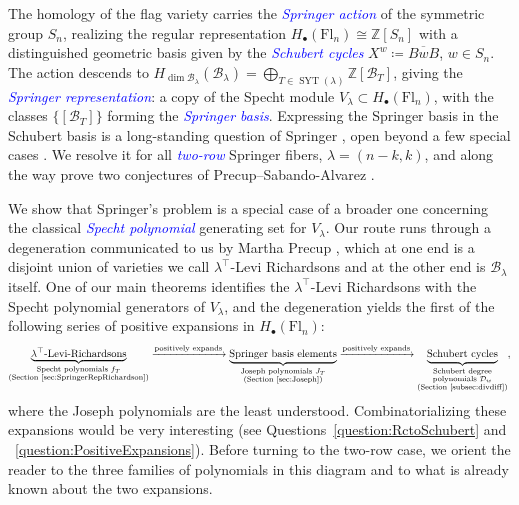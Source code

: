 \documentclass[11pt]{amsart}
\theoremstyle{definition}
\numberwithin{equation}{section}
\newcommand{\fl}[1]{\mathrm{Fl}_{#1}}
\renewcommand\emph[1]{\textcolor{blue}{\textit{#1}}} %
\newcommand{\syt}{\operatorname{SYT}} %
\begin{document}
The homology of the flag variety carries the \emph{Springer action} of the symmetric group $S_n$, realizing the regular representation $H_\bullet(\fl{n})\cong \mathbb{Z}[S_n]$ with a distinguished geometric basis given by the \emph{Schubert cycles} $X^w\coloneqq \overline{BwB}$, $w\in S_n$.
The action descends to $H_{\dim \mathcal{B}_\lambda}(\mathcal{B}_\lambda)=\bigoplus_{T\in \syt(\lambda)}\mathbb{Z}[\mathcal{B}_T]$, giving the \emph{Springer representation}: a copy of the Specht module $V_\lambda\subset H_\bullet(\fl{n})$, with the classes $\{[\mathcal{B}_T]\}$ forming the \emph{Springer basis}.
Expressing the Springer basis in the Schubert basis is a long-standing question of Springer \cite{springerconj}, open beyond a few special cases \cite{Gu89,spink2025richardsontableauxschubertpositivity}. We resolve it for all \emph{two-row} Springer fibers, $\lambda=(n-k,k)$, and along the way prove two conjectures of Precup--Sabando-Alvarez \cite[Conjectures 1,2]{sabandoalvarez2026idealsdefiningcomponentstworow}.

We show that Springer's problem is a special case of a broader one concerning the classical \emph{Specht polynomial} generating set for $V_\lambda$.
Our route runs through a degeneration communicated to us by  Martha Precup \cite{MarthaPriv},
which at one end is a disjoint union of varieties we call $\lambda^{\top}$-Levi Richardsons and at the other end is $\mathcal{B}_\lambda$ itself.
One of our main theorems identifies the $\lambda^{\top}$-Levi Richardsons with the Specht polynomial generators of $V_\lambda$, and the degeneration yields the first of the following series of positive expansions in $H_\bullet(\fl{n})$:
$$\underbrace{\lambda^{\top}\text{-Levi-Richardsons}}_{\substack{\text{Specht polynomials $f_T$}\\\text{(Section~\ref{sec:SpringerRepRichardson})}}}\xrightarrow{\text{positively expands}}\underbrace{\text{Springer basis elements}}_{\substack{\text{Joseph polynomials $J_T$}\\\text{(Section~\ref{sec:Joseph}})}}\xrightarrow{\text{positively expands}}\underbrace{\text{Schubert cycles}}_{\substack{\text{Schubert degree}\\\text{polynomials } \mathcal{D}_w\\\text{(Section~\ref{subsec:divdiff})}}},$$
where the Joseph polynomials are the least understood.
Combinatorializing these expansions would be very interesting (see Questions~\ref{question:RctoSchubert} and ~\ref{question:PositiveExpansions}).
Before turning to the two-row case, we orient the reader to the three families of
polynomials in this diagram and to what is already known about the two expansions.
\end{document}
